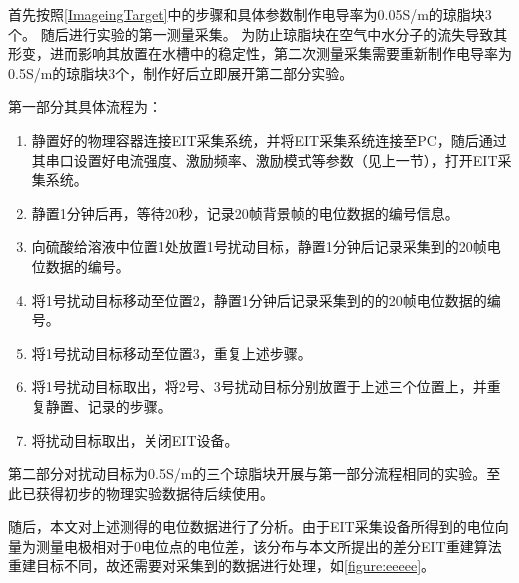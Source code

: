 首先按照\cref{ImageingTarget}中的步骤和具体参数制作电导率为0.05S/m的琼脂块3个。
随后进行实验的第一测量采集。
为防止琼脂块在空气中水分子的流失导致其形变，进而影响其放置在水槽中的稳定性，第二次测量采集需要重新制作电导率为0.5S/m的琼脂块3个，制作好后立即展开第二部分实验。

第一部分其具体流程为：
\begin{enumerate}
    \item 静置好的物理容器连接EIT采集系统，并将EIT采集系统连接至PC，随后通过其串口设置好电流强度、激励频率、激励模式等参数（见上一节），打开EIT采集系统。
    \item 静置1分钟后再，等待20秒，记录20帧背景帧的电位数据的编号信息。
    \item 向硫酸给溶液中位置1处放置1号扰动目标，静置1分钟后记录采集到的20帧电位数据的编号。
    \item 将1号扰动目标移动至位置2，静置1分钟后记录采集到的的20帧电位数据的编号。
    \item 将1号扰动目标移动至位置3，重复上述步骤。
    \item 将1号扰动目标取出，将2号、3号扰动目标分别放置于上述三个位置上，并重复静置、记录的步骤。
    \item 将扰动目标取出，关闭EIT设备。
\end{enumerate}

第二部分对扰动目标为0.5S/m的三个琼脂块开展与第一部分流程相同的实验。至此已获得初步的物理实验数据待后续使用。

随后，本文对上述测得的电位数据进行了分析。由于EIT采集设备所得到的电位向量为测量电极相对于0电位点的电位差，该分布与本文所提出的差分EIT重建算法重建目标不同，故还需要对采集到的数据进行处理，如\cref{figure:eeeee}。


